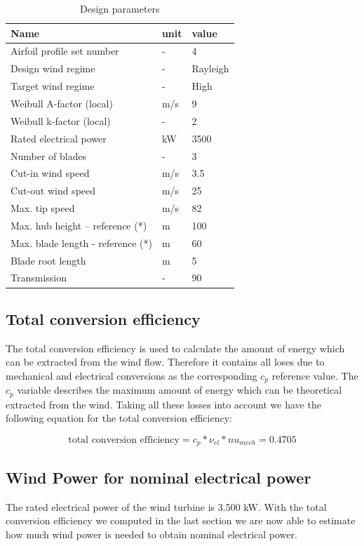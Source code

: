 \documentclass[10pt]{article}
\begin{document}
\begin{table}[H]
\begin{tabular}{l l l}
\hline
Name & unit & value\\
\hline
Airfoil profile set number	&-&	4\\
Design wind regime	&-&	Rayleigh\\
Target wind regime	&-&	High\\
Weibull A-factor (local)&	m/s&	9\\
Weibull k-factor (local)	&-&	2\\
Rated electrical power	&kW&	3500\\
Number of blades	&-&	3\\
Cut-in wind speed	&m/s&	3.5\\
Cut-out wind speed	&m/s&	25\\
Max. tip speed	&m/s&	82\\
Max. hub height – reference (*)&	m&	100\\
Max. blade length  - reference (*)	&m&	60\\
Blade root length	&m&	5\\
Transmission	&-&	90\\
\hline

\end{tabular}
\label{designparameters}
\caption{Design parameters}
\end{table}
\subsection{Total conversion efficiency}
The total conversion efficiency is used to calculate the amount of energy which can be extracted from the wind flow. Therefore it contains all loses due to mechanical and electrical conversions as the corresponding $c_p$ reference value. The $c_p$ variable describes the maximum amount of energy which can be theoretical extracted from the wind.
Taking all these losses into account we have the following equation for the total conversion efficiency:

\begin{equation}
\text{total conversion efficiency} = c_p * \nu_{el} * nu_{mech} = 	0.4705
\end{equation}

\subsection{Wind Power for nominal electrical power}
The rated electrical power of the wind turbine is 3.500 kW. With the total conversion efficiency we computed in the last section we are now able to estimate how much wind power is needed to obtain nominal electrical power.
\end{document}
